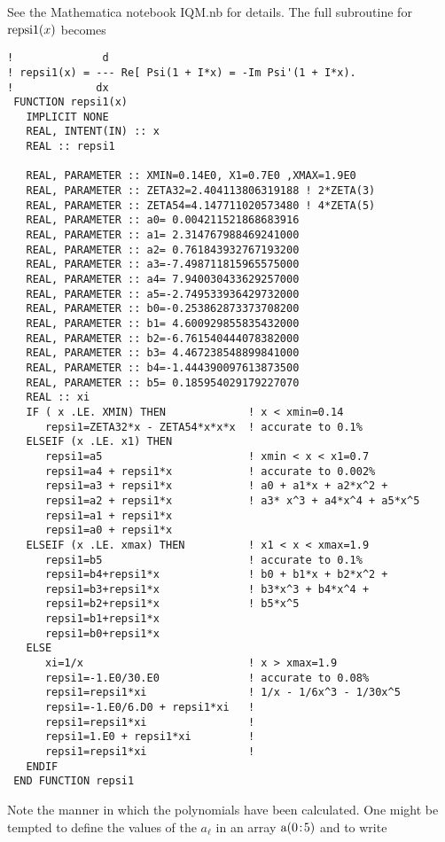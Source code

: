 \documentclass[preprint,12pt,eqsecnum,nofootinbib,amsmath,amssymb]{revtex4}
\begin{document}
\noindent
See the Mathematica notebook IQM.nb for details.
The full subroutine for ${\rm repsi1}(x)$ becomes

{
\baselineskip12pt
\begin{verbatim}
!              d
! repsi1(x) = --- Re[ Psi(1 + I*x) = -Im Psi'(1 + I*x). 
!             dx
 FUNCTION repsi1(x)  
   IMPLICIT NONE
   REAL, INTENT(IN) :: x
   REAL :: repsi1

   REAL, PARAMETER :: XMIN=0.14E0, X1=0.7E0 ,XMAX=1.9E0
   REAL, PARAMETER :: ZETA32=2.404113806319188 ! 2*ZETA(3)
   REAL, PARAMETER :: ZETA54=4.147711020573480 ! 4*ZETA(5)
   REAL, PARAMETER :: a0= 0.004211521868683916
   REAL, PARAMETER :: a1= 2.314767988469241000
   REAL, PARAMETER :: a2= 0.761843932767193200
   REAL, PARAMETER :: a3=-7.498711815965575000
   REAL, PARAMETER :: a4= 7.940030433629257000
   REAL, PARAMETER :: a5=-2.749533936429732000
   REAL, PARAMETER :: b0=-0.253862873373708200
   REAL, PARAMETER :: b1= 4.600929855835432000
   REAL, PARAMETER :: b2=-6.761540444078382000
   REAL, PARAMETER :: b3= 4.467238548899841000
   REAL, PARAMETER :: b4=-1.444390097613873500
   REAL, PARAMETER :: b5= 0.185954029179227070
   REAL :: xi
   IF ( x .LE. XMIN) THEN             ! x < xmin=0.14 
      repsi1=ZETA32*x - ZETA54*x*x*x  ! accurate to 0.1%
   ELSEIF (x .LE. x1) THEN
      repsi1=a5                       ! xmin < x < x1=0.7
      repsi1=a4 + repsi1*x            ! accurate to 0.002%
      repsi1=a3 + repsi1*x            ! a0 + a1*x + a2*x^2 +
      repsi1=a2 + repsi1*x            ! a3* x^3 + a4*x^4 + a5*x^5
      repsi1=a1 + repsi1*x
      repsi1=a0 + repsi1*x
   ELSEIF (x .LE. xmax) THEN          ! x1 < x < xmax=1.9
      repsi1=b5                       ! accurate to 0.1%
      repsi1=b4+repsi1*x              ! b0 + b1*x + b2*x^2 + 
      repsi1=b3+repsi1*x              ! b3*x^3 + b4*x^4 +
      repsi1=b2+repsi1*x              ! b5*x^5
      repsi1=b1+repsi1*x              
      repsi1=b0+repsi1*x            
   ELSE
      xi=1/x                          ! x > xmax=1.9
      repsi1=-1.E0/30.E0              ! accurate to 0.08%
      repsi1=repsi1*xi                ! 1/x - 1/6x^3 - 1/30x^5
      repsi1=-1.E0/6.D0 + repsi1*xi   ! 
      repsi1=repsi1*xi                !
      repsi1=1.E0 + repsi1*xi         !
      repsi1=repsi1*xi                !
   ENDIF
 END FUNCTION repsi1
\end{verbatim}
}

Note the manner in which the polynomials have been 
calculated. One might be tempted to define the
values of the $a_\ell$ in an array ${\rm a}(0\!:\!5)$
and to write 
\end{document}
